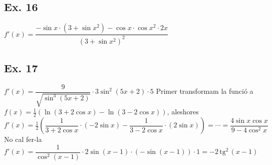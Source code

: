 \documentclass[a4paper, 11pt]{book}
\begin{document}
\subsection*{Ex. 16 }
\begin{tasks}
	\task $f'(x)=\dfrac{-\sin x \cdot (3+\sin x^2) - \cos x \cdot \cos x^2 \cdot 2x}{(3+\sin x^2)^2}$
	\end{tasks}

\subsection*{Ex. 17 }
\begin{tasks}
	\task $f'(x)=\dfrac{9}{\sqrt{\sin^3 (5x+2)}} \cdot 3 \sin^2 (5x+2) \cdot 5$
	\task Primer transformam la funció a $f(x)=\frac{1}{2} \left( \ln (3+2\cos x) - \ln(3-2\cos x)\right)$, aleshores 
	$f'(x)=\frac{1}{2} \left( \dfrac{1}{3+2\cos x} \cdot(-2\sin x) - \dfrac{1}{3-2\cos x}\cdot (2\sin x)\right)=\cdots =\dfrac{4\sin x \cos x}{9 - 4 \cos^2 x}$
	\task No cal fer-la
	\task $f'(x)=\dfrac{1}{\cos^2(x-1)}\cdot 2\sin(x-1)\cdot (-\sin(x-1)) \cdot 1 = -2\, \mathrm{tg^2}\, (x-1)$
	
\end{tasks}
\end{document}
